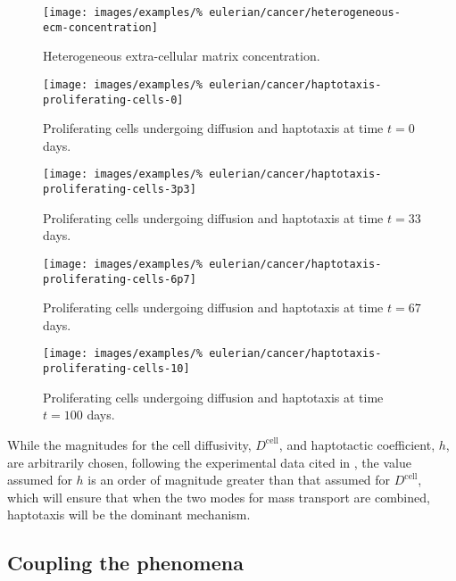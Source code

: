 \begin{figure}[!hptb]
\centering
\texttt{[image: images/examples/\%
eulerian/cancer/heterogeneous-ecm-concentration]}
\caption{Heterogeneous extra-cellular matrix concentration.}
\label{heterogeneous-ecm-concentration}
\end{figure}

\begin{figure}[!hptb]
\centering
\texttt{[image: images/examples/\%
eulerian/cancer/haptotaxis-proliferating-cells-0]}
\caption{Proliferating cells undergoing diffusion and haptotaxis at time $t=0$ days.}
\label{tumour-haptotaxis-proliferation-0}
\end{figure}

\begin{figure}[!hptb]
\centering
\texttt{[image: images/examples/\%
eulerian/cancer/haptotaxis-proliferating-cells-3p3]}
\caption{Proliferating cells undergoing diffusion and haptotaxis at time $t=33$ days.}
\label{tumour-haptotaxis-proliferation-3p3}
\end{figure}

\begin{figure}[!hptb]
\centering
\texttt{[image: images/examples/\%
eulerian/cancer/haptotaxis-proliferating-cells-6p7]}
\caption{Proliferating cells undergoing diffusion and haptotaxis at time $t=67$ days.}
\label{tumour-haptotaxis-proliferation-6p7}
\end{figure}

\begin{figure}[!hptb]
\centering
\texttt{[image: images/examples/\%
eulerian/cancer/haptotaxis-proliferating-cells-10]}
\caption{Proliferating cells undergoing diffusion and haptotaxis at time $t=100$ days.}
\label{tumour-haptotaxis-proliferation-10}
\end{figure}

While the magnitudes for the cell diffusivity, $D^{\mathrm{cell}}$,
and haptotactic coefficient, $h$, are arbitrarily chosen, following
the experimental data cited in \citet{namyetal:04}, the value assumed
for $h$ is an order of magnitude greater than that assumed for
$D^{\mathrm{cell}}$, which will ensure that when the two modes for
mass transport are combined, haptotaxis will be the dominant
mechanism.

\subsection{Coupling the phenomena}
\label{cacophonous-medley}

